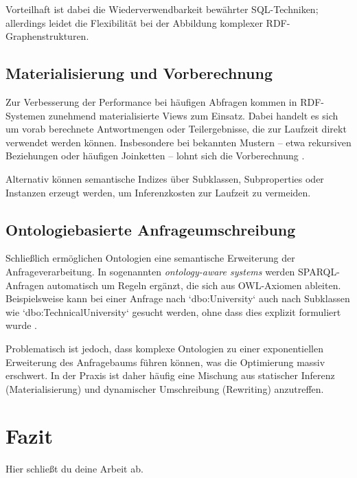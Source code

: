 \documentclass[12pt]{article}
\begin{document}
Vorteilhaft ist dabei die Wiederverwendbarkeit bewährter SQL-Techniken; allerdings leidet die Flexibilität bei der Abbildung komplexer RDF-Graphenstrukturen.

\subsection{Materialisierung und Vorberechnung}

Zur Verbesserung der Performance bei häufigen Abfragen kommen in RDF-Systemen zunehmend materialisierte Views zum Einsatz. Dabei handelt es sich um vorab berechnete Antwortmengen oder Teilergebnisse, die zur Laufzeit direkt verwendet werden können. Insbesondere bei bekannten Mustern – etwa rekursiven Beziehungen oder häufigen Joinketten – lohnt sich die Vorberechnung \cite{elzein2019materialized}.

Alternativ können semantische Indizes über Subklassen, Subproperties oder Instanzen erzeugt werden, um Inferenzkosten zur Laufzeit zu vermeiden.

\subsection{Ontologiebasierte Anfrageumschreibung}

Schließlich ermöglichen Ontologien eine semantische Erweiterung der Anfrageverarbeitung. In sogenannten \textit{ontology-aware systems} werden SPARQL-Anfragen automatisch um Regeln ergänzt, die sich aus OWL-Axiomen ableiten. Beispielsweise kann bei einer Anfrage nach `dbo:University` auch nach Subklassen wie `dbo:TechnicalUniversity` gesucht werden, ohne dass dies explizit formuliert wurde \cite{tsatsanifos2012ontologies}.

Problematisch ist jedoch, dass komplexe Ontologien zu einer exponentiellen Erweiterung des Anfragebaums führen können, was die Optimierung massiv erschwert. In der Praxis ist daher häufig eine Mischung aus statischer Inferenz (Materialisierung) und dynamischer Umschreibung (Rewriting) anzutreffen.



\section{Fazit}
Hier schließt du deine Arbeit ab.

\printbibliography
\end{document}

